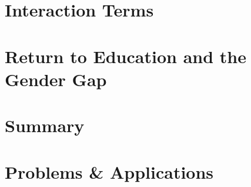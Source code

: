 \section{Interaction Terms}

\section{Return to Education and the Gender Gap}


\section{Summary}

\section{Problems \& Applications}

  
